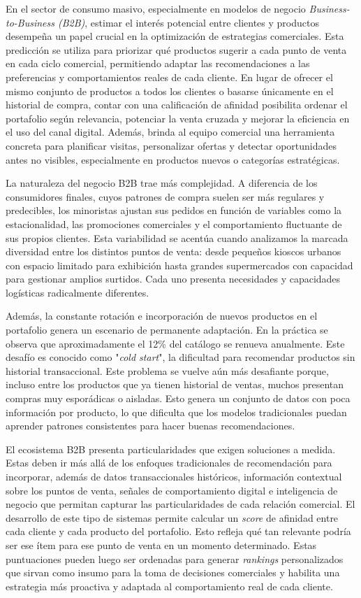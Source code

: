 \documentclass[
11pt, %
]{charter}
\begin{document}
En el sector de consumo masivo, especialmente en modelos de negocio \textit{Business-to-Business (B2B)}, estimar el interés potencial entre clientes y productos desempeña un papel crucial en la optimización de estrategias comerciales.  Esta predicción se utiliza para priorizar qué productos sugerir a cada punto de venta en cada ciclo comercial, permitiendo adaptar las recomendaciones a las preferencias y comportamientos reales de cada cliente. En lugar de ofrecer el mismo conjunto de productos a todos los clientes o basarse únicamente en el historial de compra, contar con una calificación de afinidad posibilita ordenar el portafolio según relevancia, potenciar la venta cruzada y mejorar la eficiencia en el uso del canal digital. Además, brinda al equipo comercial una herramienta concreta para planificar visitas, personalizar ofertas y detectar oportunidades antes no visibles, especialmente en productos nuevos o categorías estratégicas.

La naturaleza del negocio B2B trae más complejidad. A diferencia de los consumidores finales, cuyos patrones de compra suelen ser más regulares y predecibles, los minoristas ajustan sus pedidos en función de variables como la estacionalidad, las promociones comerciales y el comportamiento fluctuante de sus propios clientes. Esta variabilidad se acentúa cuando analizamos la marcada diversidad entre los distintos puntos de venta: desde pequeños kioscos urbanos con espacio limitado para exhibición hasta grandes supermercados con capacidad para gestionar amplios surtidos. Cada uno presenta necesidades y capacidades logísticas radicalmente diferentes.

Además, la constante rotación e incorporación de nuevos productos en el portafolio genera un escenario de permanente adaptación. En la práctica se observa que aproximadamente el 12\% del catálogo se renueva anualmente. Este desafío es conocido como "\textit{cold start}", la dificultad para recomendar productos sin historial transaccional. Este problema se vuelve aún más desafiante porque, incluso entre los productos que ya tienen historial de ventas, muchos presentan compras muy esporádicas o aisladas. Esto genera un conjunto de datos con poca información por producto, lo que dificulta que los modelos tradicionales puedan aprender patrones consistentes para hacer buenas recomendaciones.

El ecosistema B2B presenta particularidades que exigen soluciones a medida. Estas deben ir más allá de los enfoques tradicionales de recomendación para incorporar, además de datos transaccionales históricos, información contextual sobre los puntos de venta, señales de comportamiento digital e inteligencia de negocio que permitan capturar las particularidades de cada relación comercial. El desarrollo de este tipo de sistemas permite calcular un \textit{score} de afinidad entre cada cliente y cada producto del portafolio. Esto refleja qué tan relevante podría ser ese ítem para ese punto de venta en un momento determinado. Estas puntuaciones pueden luego ser ordenadas para generar \textit{rankings} personalizados que sirvan como insumo para la toma de decisiones comerciales y habilita una estrategia más proactiva y adaptada al comportamiento real de cada cliente.
\end{document}
